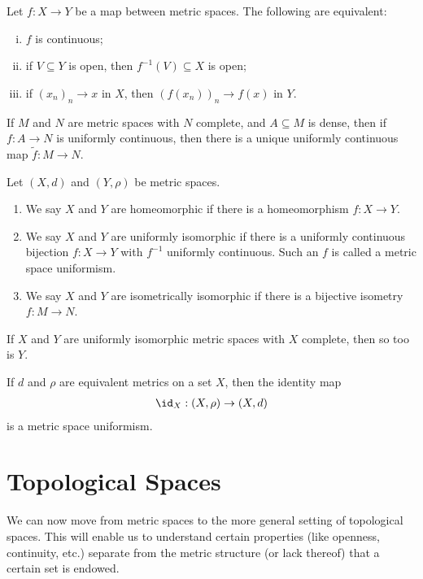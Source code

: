 \begin{fact}
  Let $f\colon X\rightarrow Y$ be a map between metric spaces. The following are equivalent:
  \begin{enumerate}[(i)]
    \item $f$ is continuous;
    \item if $V\subseteq Y$ is open, then $f^{-1}\left(V\right)\subseteq X$ is open;
    \item if $\left(x_n\right)_n\rightarrow x$ in $X$, then $\left(f\left(x_n\right)\right)_n\rightarrow f(x)$ in $Y$.
  \end{enumerate}
\end{fact}
\begin{fact}
  If $M$ and $N$ are metric spaces with $N$ complete, and $A\subseteq M$ is dense, then if $f\colon A\rightarrow N$ is uniformly continuous, then there is a unique uniformly continuous map $\tilde{f}\colon M\rightarrow N$.
\end{fact}
\begin{definition}
  Let $\left(X,d\right)$ and $\left(Y,\rho\right)$ be metric spaces.
  \begin{enumerate}[(1)]
    \item We say $X$ and $Y$ are homeomorphic if there is a homeomorphism $f\colon X\rightarrow Y$.
    \item We say $X$ and $Y$ are uniformly isomorphic if there is a uniformly continuous bijection $f\colon X\rightarrow Y$ with $f^{-1}$ uniformly continuous. Such an $f$ is called a metric space uniformism.
    \item We say $X$ and $Y$ are isometrically isomorphic if there is a bijective isometry $f\colon M\rightarrow N$.
  \end{enumerate}
\end{definition}
\begin{fact}
  If $X$ and $Y$ are uniformly isomorphic metric spaces with $X$ complete, then so too is $Y$.\newline

  If $d$ and $\rho$ are equivalent metrics on a set $X$, then the identity map
  \begin{align*}
    \id_{X}:\left(X,\rho\right)\rightarrow \left(X,d\right)
  \end{align*}
  is a metric space uniformism.
\end{fact}
\section{Topological Spaces}%
We can now move from metric spaces to the more general setting of topological spaces. This will enable us to understand certain properties (like openness, continuity, etc.) separate from the metric structure (or lack thereof) that a certain set is endowed.
